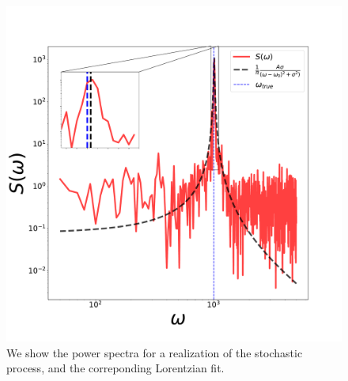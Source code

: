\begin{figure}[t!]
    \centering
    \includegraphics[width=.75\textwidth]{Figures/CMON/estimation/spectral_fit.pdf}
    \caption{We show the power spectra for a realization of the stochastic process, and the correponding Lorentzian fit.}
    \label{fig:lorentzian}
\end{figure}

